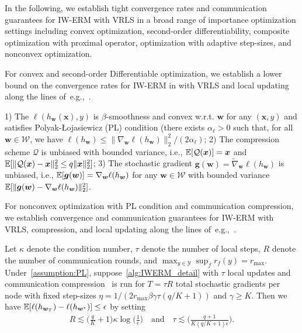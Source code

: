 In the following,  we establish tight convergence rates and communication guarantees for IW-ERM with VRLS in a broad range of importance optimization settings including convex optimization, second-order differentiability, composite optimization with proximal operator, optimization with adaptive step-sizes, and nonconvex optimization. 


For convex and second-order Differentiable optimization, we establish a lower bound on the  convergence rates for IW-ERM in with VRLS and local updating along the lines of~e.g.,~\citep[Theorem 3.1]{glasgow2022sharp}.


\begin{assumption}
\label{assumption:PL} 1) The $\ell(h_{\boldsymbol{w}}(\boldsymbol{x}),y)$ is $\beta$-smoothness and convex w.r.t. $\boldsymbol{w}$ for any $(\boldsymbol{x},y)$ and satisfies Polyak-{\L}ojasiewicz (PL) condition (there exists $\alpha_{\ell} >0$ such that, for all $\boldsymbol{w}\in\mathcal{W}$, we have 
$\ell(h_{\boldsymbol{w}})\le  {\| \nabla_{\boldsymbol{w}}\ell(h_{\boldsymbol{w}}) \|_2^2}/{(2\alpha_{\ell})}$; 2) The compression scheme $\mathcal{Q}$ is unbiased with bounded variance, i.e., $\mathbb{E}[\mathcal{Q}(\boldsymbol{x})]=\boldsymbol{x}$ and $\mathbb{E}[\|\mathcal{Q}(\boldsymbol{x})-\boldsymbol{x}\|_2^2\leq q\|\boldsymbol{x}\|_2^2]$; 3) The stochastic gradient $\boldsymbol{g}(\boldsymbol{w})=\widetilde\nabla_{\boldsymbol{w}}\ell(h_{\boldsymbol{w}})$ is unbiased, i.e., $\mathbb{E}[\boldsymbol{g}(\boldsymbol{w})]=\nabla_{\boldsymbol{w}}\ell(h_{\boldsymbol{w}})$ for any $\boldsymbol{w}\in\mathcal{W}$ with bounded variance  $\mathbb{E}[\|\boldsymbol{g}(\boldsymbol{w})-\nabla_{\boldsymbol{w}}\ell(h_{\boldsymbol{w}})\|_2^2]$.
\end{assumption}


For nonconvex optimization with PL condition and communication compression, we establish convergence and communication guarantees  for IW-ERM with VRLS, compression,  and local updating along the lines of~e.g.,~\citep[Theorem 5.1]{haddadpour2021federated}.

\begin{theorem}
\label{app:PL} Let $\kappa$ denote the condition number, $\tau$ denote the number of local steps,  $R$ denote the number of communication rounds, and $\max_{y\in\mathcal{Y}}\sup_f r_f(y)=r_{\max}$. Under~\cref{assumption:PL}, suppose~\cref{alg:IWERM_detail} with $\tau$ local updates and communication compression~\citep[Algorithm 1]{haddadpour2021federated} is run for $T=\tau R$ total stochastic gradients per node with fixed step-sizes $\eta=1/(2r_{\max}\beta\gamma\tau(q/K+1))$ and $\gamma\geq K$. Then we have $\mathbb{E}[\ell(h_{\boldsymbol{w}_T})-\ell(h_{\boldsymbol{w}^\star})]\leq\epsilon$ by setting 
\begin{align}
R\lesssim \Big(\frac{q}{K}+1\Big)\kappa\log\Big(\frac{1}{\epsilon}\Big) \quad\text{and} \quad \tau\lesssim\Big(\frac{q+1}{K(q/K+1)\epsilon}\Big). 
\end{align}
\end{theorem}

